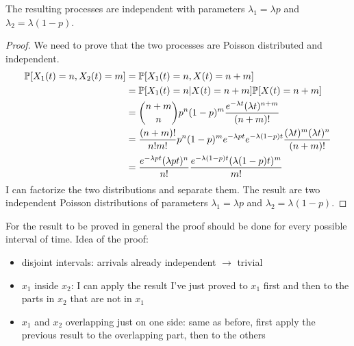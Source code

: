 \begin{itemize}
\begin{figure}[H]
					\end{figure}
			 The resulting processes are independent with parameters $\lambda_1=\lambda p$ and $\lambda_2 = \lambda (1 - p)$.
			 \begin{proof}
				We need to prove that the two processes are Poisson distributed and independent.
				\begin{equation}
				 \begin{split}
					\mathbb{P}[X_1(t) = n, X_2(t)=m] &= \mathbb{P}[X_1(t)=n, X(t)= n +m] \\
					&= \mathbb{P}[X_1(t)=n | X(t)=n+m]\mathbb{P}[X(t)=n+m]\\
					&= {{n+m}\choose{n}}p^n(1-p)^m \frac{e^{-\lambda t}(\lambda t)^{n+m}}{(n+m)!}\\
					&= \frac{(n+m)!}{n!m!}p^n(1-p)^m e^{-\lambda p t}e^{-\lambda (1-p)t}\frac{(\lambda t)^m (\lambda t)^n}{(n+m)!}\\
					&= \frac{e^{-\lambda p t}(\lambda p t)^n}{n!}\frac{e^{-\lambda (1-p) t}(\lambda (1-p) t)^m}{m!}
				 \end{split}
				\end{equation}
				I can factorize the two distributions and separate them.
							The result are two independent Poisson distributions of parameters $\lambda_1=\lambda p$ and $\lambda_2 = \lambda (1 - p)$.
			 \end{proof}
			 For the result to be proved in general the proof should be done for every possible interval of time. Idea of the proof:
			 \begin{itemize}
				\item disjoint intervals: arrivals already independent $\rightarrow$ trivial
				\item $x_1$ inside $x_2$: I can apply the result I've just proved to $x_1$ first and then to the parts in $x_2$ that are not in $x_1$
				\item $x_1$ and $x_2$ overlapping just on one side: same as before, first apply the previous result to the overlapping part, then to the others
			 \end{itemize}
	\end{itemize}

